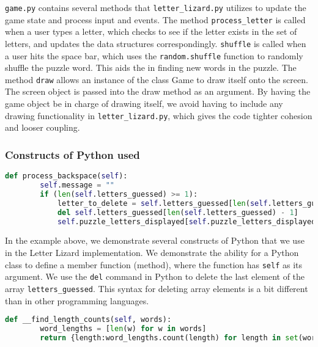 	\texttt{game.py} contains several methods that \texttt{letter\_lizard.py} utilizes to update the game state and process input and events. The method \texttt{process\_letter} is called when a user types a letter, which checks to see if the letter exists in the set of letters, and updates the data structures correspondingly. \texttt{shuffle} is called when a user hits the space bar, which uses the \texttt{random.shuffle} function to randomly shuffle the puzzle word. This aids the in finding new words in the puzzle. The method \texttt{draw} allows an instance of the class Game to draw itself onto the screen. The screen object is passed into the draw method as an argument. By having the game object be in charge of drawing itself, we avoid having to include any drawing functionality in \texttt{letter\_lizard.py}, which gives the code tighter cohesion and looser coupling.
	
\subsubsection{Constructs of Python used}
\label{pyconstructs}

\begin{lstlisting}[language=Python, %
  caption=Basic constructs of Python used]
    def process_backspace(self):
        self.message = ""
        if (len(self.letters_guessed) >= 1):
            letter_to_delete = self.letters_guessed[len(self.letters_guessed) - 1]
            del self.letters_guessed[len(self.letters_guessed) - 1]
            self.puzzle_letters_displayed[self.puzzle_letters_displayed.index('')] = letter_to_delete
\end{lstlisting}
In the example above, we demonstrate several constructs of Python that we use in the Letter Lizard implementation. We demonstrate the ability for a Python class to define a member function (method), where the function has \texttt{self} as its argument. We use the \texttt{del} command in Python to delete the last element of the array \texttt{letters\_guessed}. This syntax for deleting array elements is a bit different than in other programming languages.

\begin{lstlisting}[language=Python, %
  caption=Demonstration of functional programming constructs in Python]
    def __find_length_counts(self, words):
        word_lengths = [len(w) for w in words]
        return {length:word_lengths.count(length) for length in set(word_lengths)}
\end{lstlisting}

